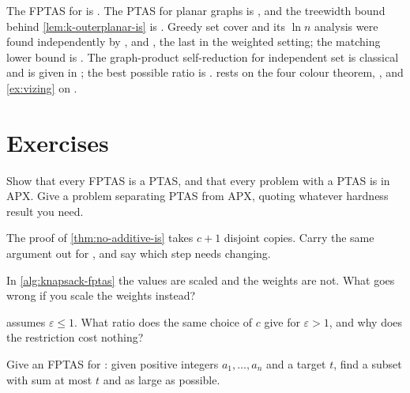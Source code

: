The FPTAS for  is \citet{IbarraKim1975}. The PTAS for planar
graphs is \citet{Baker1994}, and the treewidth bound behind
\cref{lem:k-outerplanar-is} is \citet{Bodlaender1988}. Greedy set cover and its
$\ln n$ analysis were found independently by \citet{Johnson1974},
\citet{Lovasz1975} and \citet{Chvatal1979}, the last in the weighted setting;
the matching lower bound is \citet{Feige1998}. The graph-product
self-reduction for independent set is classical and is given in
\citet{GareyJohnson1979}; the best possible ratio is \citet{Zuckerman2007}.  rests on the
four colour theorem, \citet{AppelHaken1977}, and \cref{ex:vizing} on
\citet{Vizing1964}.

\section{Exercises}
\label{sec:ex-approx-ii}

\begin{exercise}
Show that every FPTAS is a PTAS, and that every problem with a PTAS is in
\textrm{APX}. Give a problem separating PTAS from \textrm{APX}, quoting whatever
hardness result you need.
\end{exercise}

\begin{exercise}
The proof of \cref{thm:no-additive-is} takes $c+1$ disjoint copies. Carry the
same argument out for , and say which step needs changing.
\end{exercise}

\begin{exercise}
In \cref{alg:knapsack-fptas} the values are scaled and the weights are not.
What goes wrong if you scale the weights instead?
\end{exercise}

\begin{exercise}
 assumes $\varepsilon \le 1$. What ratio does the same
choice of $c$ give for $\varepsilon > 1$, and why does the restriction cost
nothing?
\end{exercise}

\begin{exercise}
Give an FPTAS for : given positive integers $a_1,\dots,a_n$ and
a target $t$, find a subset with sum at most $t$ and as large as possible.
\end{exercise}

